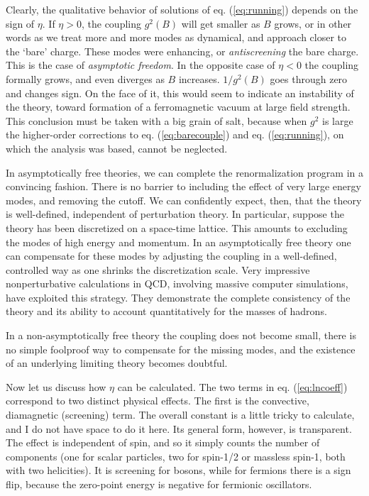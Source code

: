 \documentclass[aps,epsf]{revtex4}
\begin{document}
Clearly, the
qualitative behavior of solutions of eq. (\ref{eq:running}) depends on the
sign of $\eta$.  If $\eta > 0$, the coupling $g^2(B)$ will get smaller
as $B$ grows, or in other words as we treat more and more modes as
dynamical, and approach closer to the `bare' charge.  These modes
were enhancing, or {\it antiscreening\/} the bare charge.  This is the
case of {\it asymptotic freedom}.  In the opposite case of $\eta < 0$
the coupling formally grows, and even diverges as $B$
increases. $1/g^2(B)$ goes through zero and changes sign.  On the face of
it, this would seem to indicate an instability of the theory, toward
formation of a ferromagnetic vacuum at large field strength.  This
conclusion must be taken with a big grain of salt, because when $g^2$
is large the higher-order corrections to eq. (\ref{eq:barecouple}) and
eq. (\ref{eq:running}), on which the analysis was based, cannot be
neglected.  

In asymptotically free theories, we can complete the
renormalization program in a convincing fashion.  There is no barrier
to including the effect of very large energy modes, and removing the
cutoff.  We can confidently expect, then, that the theory is
well-defined, independent of perturbation theory.  In particular,
suppose the theory has been discretized on a space-time lattice.  This
amounts to excluding the modes of high energy and momentum.  In an
asymptotically free theory one can compensate for these modes by
adjusting the coupling in a well-defined, controlled way as one shrinks
the discretization scale.  Very impressive nonperturbative
calculations in QCD, involving massive computer simulations, have
exploited this strategy.  They demonstrate the complete consistency of
the theory and its ability to account quantitatively for the masses of
hadrons.

In a non-asymptotically free theory the coupling does not become
small, there is no simple foolproof way to compensate for the missing
modes, and the existence of an underlying limiting theory becomes
doubtful.

Now
let us discuss how $\eta$ can be calculated.  The two terms in
eq. (\ref{eq:lncoeff}) correspond to two distinct physical effects.  The
first is the convective, diamagnetic (screening) term.  The overall
constant is a little tricky to calculate, and I do not have space to
do it here.  Its general form, however, is transparent.  The effect is
independent of spin, and so it simply counts the number of components
(one for scalar particles, two for spin-1/2 or massless spin-1, both
with two helicities).  It is screening for bosons, while for fermions
there is a sign flip, because the zero-point energy is negative for
fermionic oscillators.  
\end{document}
